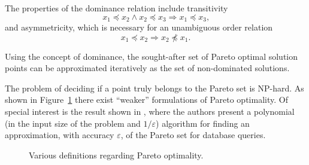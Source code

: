 
The properties of the dominance relation include transitivity
%
\begin{equation*}
  x_1 \preceq x_2 \wedge x_2 \preceq x_3 \Rightarrow x_1 \preceq x_3 \text{,}
\end{equation*}
%
  and asymmetricity, which is necessary for an unambiguous order relation
%
\begin{equation*}
  x_1 \preceq x_2 \Rightarrow x_2 \not\preceq x_1 \text{.}
\end{equation*}
%

Using the concept of dominance, the sought-after set of Pareto optimal
  solution points can be approximated iteratively as the set of non-dominated
  solutions.

The problem of deciding if a point truly belongs to the Pareto set is NP-hard.
As shown in Figure~\ref{fig:pareto-def} there exist ``weaker'' formulations of
  Pareto optimality.
Of special interest is the result shown in \cite{paya:01}, where the authors
  present a polynomial (in the input size of the problem and $1/\varepsilon$)
  algorithm for finding an approximation, with accuracy $\varepsilon$, of the
  Pareto set for database queries.

  \begin{figure}[tp]
  \begin{center}
  \end{center}
  \caption{Various definitions regarding Pareto optimality.}
  \label{fig:pareto-def}
\end{figure}





